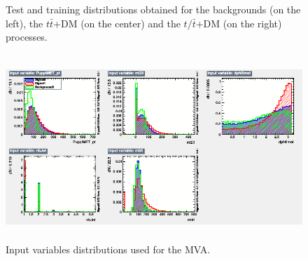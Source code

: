 \documentclass[a4paper, 10pt, openright]{report}
\begin{document}
\begin{figure}[htbp]
\caption{Test and training distributions obtained for the backgrounds (on the left), the $t \bar t$+DM (on the center) and the $t/\bar t$+DM (on the right) processes.}
\label{fig:overtraining}
\end{figure}

\begin{figure}[htbp]
\centering
\includegraphics[width=12cm, height=7cm]{figs/input_distributions.png}
\caption{Input variables distributions used for the \ac{MVA}.}
\label{fig:inputVar}
\end{figure}
\end{document}
